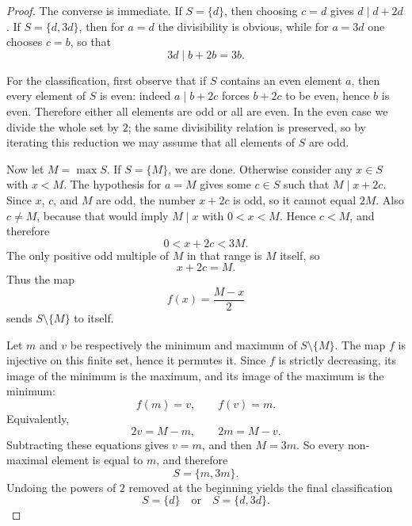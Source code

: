\begin{proof}
The converse is immediate. If \(S=\{d\}\), then choosing \(c=d\) gives
\(d \mid d+2d\). If \(S=\{d,3d\}\), then for \(a=d\) the divisibility is
obvious, while for \(a=3d\) one chooses \(c=b\), so that
\[
  3d \mid b+2b = 3b.
\]

For the classification, first observe that if \(S\) contains an even element
\(a\), then every element of \(S\) is even: indeed \(a\mid b+2c\) forces
\(b+2c\) to be even, hence \(b\) is even. Therefore either all elements are
odd or all are even. In the even case we divide the whole set by \(2\); the
same divisibility relation is preserved, so by iterating this reduction we may
assume that all elements of \(S\) are odd.

Now let \(M=\max S\). If \(S=\{M\}\), we are done. Otherwise consider any
\(x \in S\) with \(x<M\). The hypothesis for \(a=M\) gives some \(c \in S\)
such that \(M \mid x+2c\). Since \(x\), \(c\), and \(M\) are odd, the number
\(x+2c\) is odd, so it cannot equal \(2M\). Also \(c \neq M\), because that
would imply \(M \mid x\) with \(0 < x < M\). Hence \(c<M\), and therefore
\[
  0 < x+2c < 3M.
\]
The only positive odd multiple of \(M\) in that range is \(M\) itself, so
\[
  x+2c = M.
\]
Thus the map
\[
  f(x) = \frac{M-x}{2}
\]
sends \(S \setminus \{M\}\) to itself.

Let \(m\) and \(v\) be respectively the minimum and maximum of
\(S \setminus \{M\}\). The map \(f\) is injective on this finite set, hence it
permutes it. Since \(f\) is strictly decreasing, its image of the minimum is
the maximum, and its image of the maximum is the minimum:
\[
  f(m)=v,\qquad f(v)=m.
\]
Equivalently,
\[
  2v = M-m,\qquad 2m = M-v.
\]
Subtracting these equations gives \(v=m\), and then \(M=3m\). So every
non-maximal element is equal to \(m\), and therefore
\[
  S = \{m,3m\}.
\]
Undoing the powers of \(2\) removed at the beginning yields the final
classification
\[
  S=\{d\}\quad\text{or}\quad S=\{d,3d\}.
\]
\end{proof}
